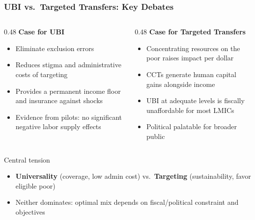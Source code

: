 \documentclass[aspectratio=169]{beamer}
\begin{document}
\begin{frame}
\frametitle{UBI vs.\ Targeted Transfers: Key Debates}

\begin{columns}
\begin{column}{0.48\textwidth}
  \textbf{Case for UBI}
  \begin{itemize}\setlength\itemsep{4pt}
    \item Eliminate exclusion errors
    \item Reduces stigma and administrative costs of targeting
    \item Provides a permanent income floor and insurance against shocks
    \item Evidence from pilots: no significant negative labor supply effects
  \end{itemize}
\end{column}
\begin{column}{0.48\textwidth}
  \textbf{Case for Targeted Transfers}
  \begin{itemize}\setlength\itemsep{4pt}
    \item Concentrating resources on the poor raises impact per dollar 
    \item CCTs generate human capital gains alongside income 
    \item UBI at adequate levels is fiscally unaffordable for most LMICs
    \item Political palatable for broader public
  \end{itemize}
\end{column}
\end{columns}

\medskip
\begin{block}{Central tension}
  \begin{itemize}\setlength\itemsep{3pt}
    \item[$\to$] \textbf{Universality} (coverage, low admin cost) vs.\ \textbf{Targeting} (sustainability, favor eligible poor)
    \item[$\to$] Neither dominates: optimal mix depends on fiscal/political constraint and objectives
  \end{itemize}
\end{block}
\end{frame}
\end{document}
